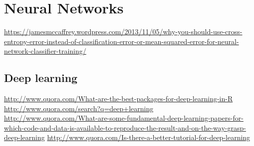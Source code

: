 \documentclass[11pt,a4paper]{article}
\begin{document}
\section{Neural Networks}
\label{sec:Neural Networks}
\url{https://jamesmccaffrey.wordpress.com/2013/11/05/why-you-should-use-cross-entropy-error-instead-of-classification-error-or-mean-squared-error-for-neural-network-classifier-training/}
\subsection{Deep learning}
\label{sub:Deep learning}
\url{http://www.quora.com/What-are-the-best-packages-for-deep-learning-in-R}\\
\url{http://www.quora.com/search?q=deep+learning}\\
\url{http://www.quora.com/What-are-some-fundamental-deep-learning-papers-for-which-code-and-data-is-available-to-reproduce-the-result-and-on-the-way-grasp-deep-learning}
\url{http://www.quora.com/Is-there-a-better-tutorial-for-deep-learning}












%
%
\end{document}
